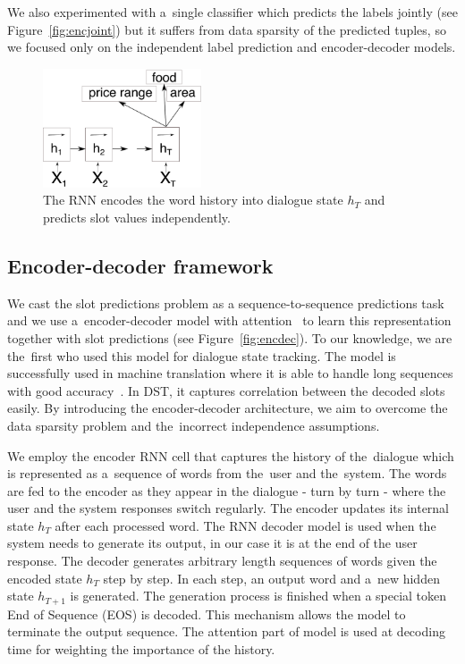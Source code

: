 \documentclass{itatnew}
\begin{document}
We also experimented with a~single classifier which predicts the labels jointly (see Figure~\ref{fig:encjoint}) but it suffers from data sparsity of the predicted tuples, so we focused only on the independent label prediction and encoder-decoder models.

\begin{figure}
\begin{center}
\includegraphics[height=9.5em]{encoder}
\caption{The RNN encodes the word history into dialogue state $h_T$ and predicts slot values independently.}
\end{center}
\vspace{-0.80em}
\label{fig:encind}
\end{figure}

\subsection{Encoder-decoder framework}
\label{sec:encdec}
We cast the slot predictions problem as a sequence-to-sequence predictions task and we use a~encoder-decoder model with attention~\cite{bahdanau2014neural} to learn this representation together with slot predictions (see Figure~\ref{fig:encdec}).
To our knowledge, we are the~first who used this model for dialogue state tracking.
The model is successfully used in machine translation where it is able to handle long sequences with good accuracy~\cite{bahdanau2014neural}.
In DST, it captures correlation between the decoded slots easily. 
By introducing the encoder-decoder architecture, we aim to overcome the data sparsity problem and the~incorrect independence assumptions.

We employ the encoder RNN cell that captures the history of the~dialogue which is represented as a~sequence of words from the~user and the~system.
The words are fed to the encoder as they appear in the dialogue - turn by turn - where the user and the system responses switch regularly.
The encoder updates its internal state $h_T$ after each processed word.
The RNN decoder model is used when the system needs to generate its output, in our case it is at the end of the user response.
The decoder generates arbitrary length sequences of words given the encoded state $h_T$ step by step.
In each step, an output word and a~new hidden state $h_{T+1}$ is generated.
The generation process is finished when a special token End of Sequence (EOS) is decoded.
This mechanism allows the model to terminate the output sequence.
The attention part of model is used at decoding time for weighting the importance of the history. 
\end{document}
